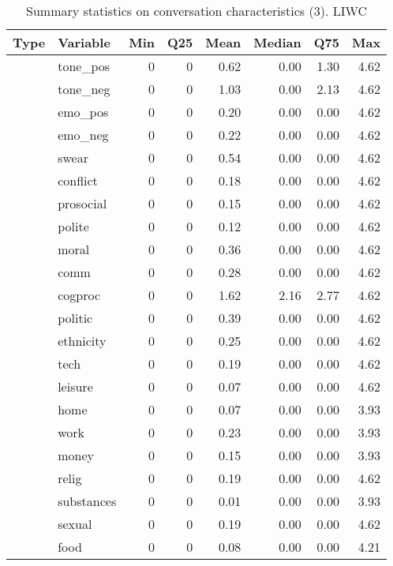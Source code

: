 \begin{table}[!h]
\centering
\caption{\label{tab:summ-tab-liwc}Summary statistics on conversation characteristics (3). LIWC}
\centering
\begin{tabular}[t]{llrrrrrr}
\toprule
Type & Variable & Min & Q25 & Mean & Median & Q75 & Max\\
\midrule
 & tone\_pos & 0 & 0 & 0.62 & 0.00 & 1.30 & 4.62\\
\cmidrule{2-8}
 & tone\_neg & 0 & 0 & 1.03 & 0.00 & 2.13 & 4.62\\
\cmidrule{2-8}
 & emo\_pos & 0 & 0 & 0.20 & 0.00 & 0.00 & 4.62\\
\cmidrule{2-8}
 & emo\_neg & 0 & 0 & 0.22 & 0.00 & 0.00 & 4.62\\
\cmidrule{2-8}
 & swear & 0 & 0 & 0.54 & 0.00 & 0.00 & 4.62\\
\cmidrule{2-8}
 & conflict & 0 & 0 & 0.18 & 0.00 & 0.00 & 4.62\\
\cmidrule{2-8}
 & prosocial & 0 & 0 & 0.15 & 0.00 & 0.00 & 4.62\\
\cmidrule{2-8}
 & polite & 0 & 0 & 0.12 & 0.00 & 0.00 & 4.62\\
\cmidrule{2-8}
 & moral & 0 & 0 & 0.36 & 0.00 & 0.00 & 4.62\\
\cmidrule{2-8}
 & comm & 0 & 0 & 0.28 & 0.00 & 0.00 & 4.62\\
\cmidrule{2-8}
 & cogproc & 0 & 0 & 1.62 & 2.16 & 2.77 & 4.62\\
\cmidrule{2-8}
 & politic & 0 & 0 & 0.39 & 0.00 & 0.00 & 4.62\\
\cmidrule{2-8}
 & ethnicity & 0 & 0 & 0.25 & 0.00 & 0.00 & 4.62\\
\cmidrule{2-8}
 & tech & 0 & 0 & 0.19 & 0.00 & 0.00 & 4.62\\
\cmidrule{2-8}
 & leisure & 0 & 0 & 0.07 & 0.00 & 0.00 & 4.62\\
\cmidrule{2-8}
 & home & 0 & 0 & 0.07 & 0.00 & 0.00 & 3.93\\
\cmidrule{2-8}
 & work & 0 & 0 & 0.23 & 0.00 & 0.00 & 3.93\\
\cmidrule{2-8}
 & money & 0 & 0 & 0.15 & 0.00 & 0.00 & 3.93\\
\cmidrule{2-8}
 & relig & 0 & 0 & 0.19 & 0.00 & 0.00 & 4.62\\
\cmidrule{2-8}
 & substances & 0 & 0 & 0.01 & 0.00 & 0.00 & 3.93\\
\cmidrule{2-8}
 & sexual & 0 & 0 & 0.19 & 0.00 & 0.00 & 4.62\\
\cmidrule{2-8}
 & food & 0 & 0 & 0.08 & 0.00 & 0.00 & 4.21\\

\end{tabular}
\end{table}
